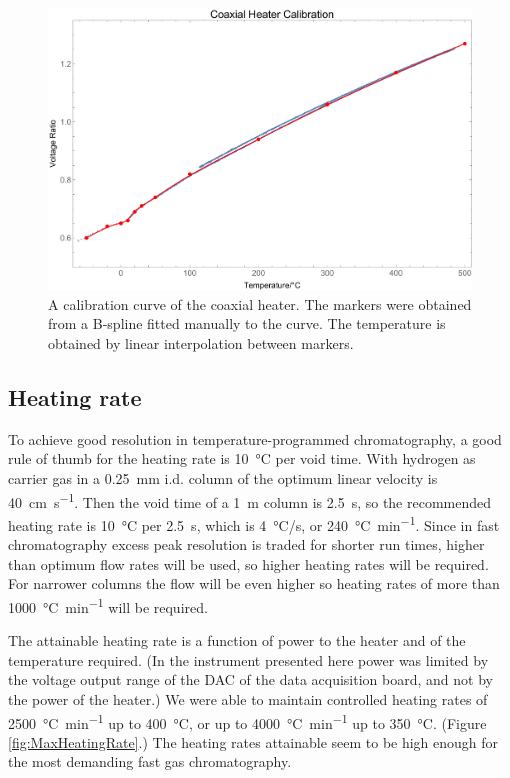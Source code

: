 \documentclass[aip,rsi,preprint,graphicx]{revtex4-1} %
\begin{document}
\begin{figure}
\includegraphics[width=\textwidth]{./Figures/2019_07_12_B-spline_fit_CPlot.pdf}%

\caption{\label{TempCal}A calibration curve of the coaxial heater. The markers
were obtained from a B-spline fitted manually to the curve. The temperature is
obtained by linear interpolation between markers.}%

\end{figure}

\subsection{Heating rate}

To achieve good resolution in temperature-programmed chromatography, a good rule
of thumb for the heating rate is \SI{10}{\celsius} per void
time\cite{Blumberg2000}. With hydrogen as carrier gas in a
\SI{0.25}{\milli\metre} i.d. column of the optimum linear velocity is
\SI{40}{\centi\metre\per\second}. Then the void time of a \SI{1}{\metre} column
is \SI{2.5}{\s}, so the recommended heating rate is \SI{10}{\celsius} per
\SI{2.5}{\s}, which is \SI{4}{\celsius}/s, or \SI{240}{\celsius\per\minute}.
Since in fast chromatography excess peak resolution is traded for shorter run
times, higher than optimum flow rates will be used, so higher heating rates will
be required. For narrower columns the flow will be even higher so heating rates
of more than \SI{1000}{\celsius\per\minute} will be required.

The attainable heating rate is a function of power to the heater and of the
temperature required. (In the instrument presented here power was limited by the
voltage output range of the DAC of the data acquisition board, and not by the
power of the heater.) We were able to maintain controlled heating rates of
\SI{2500}{\celsius\per\minute} up to \SI{400}{\celsius}, or up to \SI{4000}{\celsius\per\minute}
up to \SI{350}{\celsius}. (Figure \ref{fig:MaxHeatingRate}.) The heating rates
attainable seem to be high enough for the most demanding fast gas
chromatography.
\end{document}
